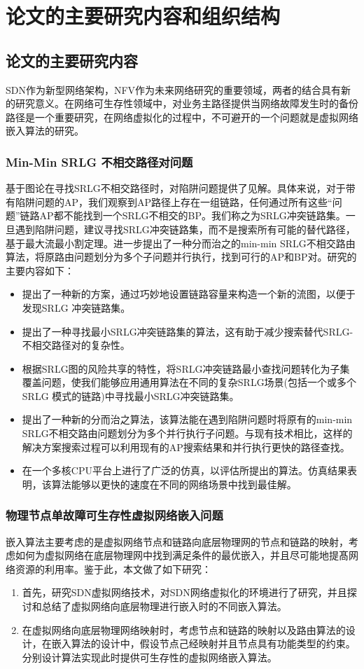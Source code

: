 \section{论文的主要研究内容和组织结构}
\subsection{论文的主要研究内容}
SDN作为新型网络架构，NFV作为未来网络研究的重要领域，两者的结合具有新的研究意义。在网络可生存性领域中，对业务主路径提供当网络故障发生时的备份路径是一个重要研究，在网络虚拟化的过程中，不可避开的一个问题就是虚拟网络嵌入算法的研究。
\subsubsection{Min-Min SRLG 不相交路径对问题}
基于图论在寻找SRLG不相交路径时，对陷阱问题提供了见解。具体来说，对于带有陷阱问题的AP，我们观察到AP路径上存在一组链路，任何通过所有这些“问题”链路AP都不能找到一个SRLG不相交的BP。我们称之为SRLG冲突链路集。一旦遇到陷阱问题，建议寻找SRLG冲突链路集，而不是搜索所有可能的替代路径，基于最大流最小割定理\cite{ford2015flows}。进一步提出了一种分而治之的min-min SRLG不相交路由算法，将原路由问题划分为多个子问题并行执行，找到可行的AP和BP对。研究的主要内容如下：
\begin{itemize}
  \item 提出了一种新的方案，通过巧妙地设置链路容量来构造一个新的流图，以便于发现SRLG 冲突链路集。
  \item 提出了一种寻找最小SRLG冲突链路集的算法，这有助于减少搜索替代SRLG- 不相交路径对的复杂性。
  \item 根据SRLG图的风险共享的特性，将SRLG冲突链路最小查找问题转化为子集覆盖问题，使我们能够应用通用算法在不同的复杂SRLG场景(包括一个或多个SRLG 模式的链路)中寻找最小SRLG冲突链路集。
  \item 提出了一种新的分而治之算法，该算法能在遇到陷阱问题时将原有的min-min SRLG不相交路由问题划分为多个并行执行子问题。与现有技术相比，这样的解决方案搜索过程可以利用现有的AP搜索结果和并行执行更快的路径查找。
  \item 在一个多核CPU平台上进行了广泛的仿真，以评估所提出的算法。仿真结果表明，该算法能够以更快的速度在不同的网络场景中找到最佳解。
\end{itemize}

\subsubsection{物理节点单故障可生存性虚拟网络嵌入问题}
嵌入算法主要考虑的是虚拟网络节点和链路向底层物理网的节点和链路的映射，考虑如何为虚拟网络在底层物理网中找到满足条件的最优嵌入，并且尽可能地提髙网络资源的利用率。鉴于此，本文做了如下研究：
\begin{enumerate}
  \item 首先，研究SDN虚拟网络技术，对SDN网络虚拟化的环境进行了研究，并且探讨和总结了虚拟网络向底层物理进行嵌入时的不同嵌入算法。
  \item 在虚拟网络向底层物理网络映射时，考虑节点和链路的映射以及路由算法的设计，在嵌入算法的设计中，假设节点己经映射并且节点具有功能类型的约束。分别设计算法实现此时提供可生存性的虚拟网络嵌入算法。
\end{enumerate}

